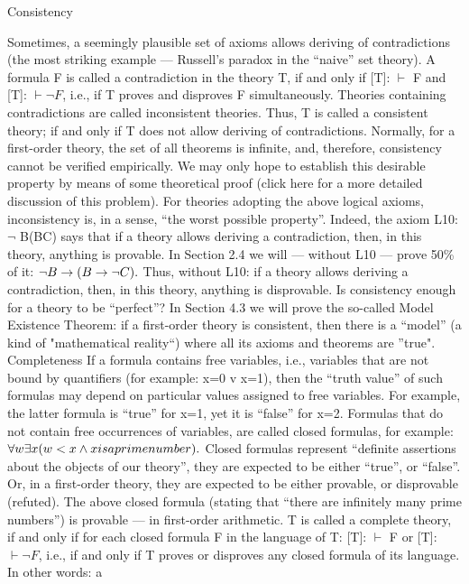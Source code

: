 Consistency

Sometimes, a seemingly plausible set of axioms allows deriving of contradictions (the most striking
example --- Russell's paradox in the ``naive'' set theory). A formula F is called a contradiction in the
theory T, if and only if [T]: \(\vdash\) F and [T]: \(\vdash \neg F\), i.e., if T proves and disproves F simultaneously. Theories
containing contradictions are called inconsistent theories. Thus, T is called a consistent theory; if and
only if T does not allow deriving of contradictions.
Normally, for a first-order theory, the set of all theorems is infinite, and, therefore, consistency cannot be
verified empirically. We may only hope to establish this desirable property by means of some
theoretical proof (click here for a more detailed discussion of this problem).
For theories adopting the above logical axioms, inconsistency is, in a sense, ``the worst possible property''.
Indeed, the axiom L10: \(\neg\) B\IMPLIES (B\IMPLIES C) says that if a theory allows deriving a contradiction, then, in this
theory, anything is provable. In Section 2.4 we will --- without L10 --- prove 50\% of it: \(\neg B\rightarrow (B\rightarrow \neg C).\)
Thus, without L10: if a theory allows deriving a contradiction, then, in this theory, anything is
disprovable.
Is consistency enough for a theory to be ``perfect''? In Section 4.3 we will prove the so-called Model
Existence Theorem: if a first-order theory is consistent, then there is a ``model'' (a kind of "mathematical
reality``) where all its axioms and theorems are ''true".
Completeness
If a formula contains free variables, i.e., variables that are not bound by quantifiers (for example: x=0 v
x=1), then the ``truth value'' of such formulas may depend on particular values assigned to free variables.
For example, the latter formula is ``true'' for x=1, yet it is ``false'' for x=2. Formulas that do not contain
free occurrences of variables, are called closed formulas, for example:
\(\forall w\exists x( w<x \wedge  x is a prime number).\)
Closed formulas represent ``definite assertions about the objects of our theory'', they are expected to be
either ``true'', or ``false''. Or, in a first-order theory, they are expected to be either provable, or disprovable
(refuted). The above closed formula (stating that ``there are infinitely many prime numbers'') is provable ---
in first-order arithmetic.
T is called a complete theory, if and only if for each closed formula F in the language of T: [T]: \(\vdash\) F or
[T]: \(\vdash \neg F\), i.e., if and only if T proves or disproves any closed formula of its language. In other words: a
